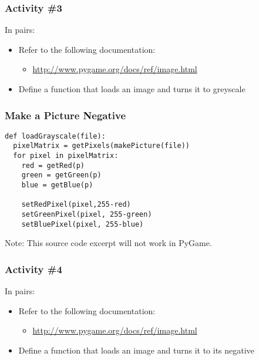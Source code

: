 \begin{frame}
	\frametitle{Activity \#3}
	
	In pairs:
	
	\vspace{2em}
	
	\begin{itemize}
		\item Refer to the following documentation:
		\begin{itemize}
			\item \url{http://www.pygame.org/docs/ref/image.html}
		\end{itemize}
		\item Define a function that loads an image and turns it to greyscale
	\end{itemize}
\end{frame}

\begin{frame}[fragile]
	\frametitle{Make a Picture Negative}
	
\begin{lstlisting}
def loadGrayscale(file):
  pixelMatrix = getPixels(makePicture(file))
  for pixel in pixelMatrix:
    red = getRed(p)
    green = getGreen(p)
    blue = getBlue(p)
        
    setRedPixel(pixel,255-red)
    setGreenPixel(pixel, 255-green)
    setBluePixel(pixel, 255-blue)
\end{lstlisting}

Note: This source code excerpt will not work in PyGame.

\end{frame}

\begin{frame}
	\frametitle{Activity \#4}
	
	In pairs:
	
	\vspace{2em}
	
	\begin{itemize}
		\item Refer to the following documentation:
		\begin{itemize}
			\item \url{http://www.pygame.org/docs/ref/image.html}
		\end{itemize}
		\item Define a function that loads an image and turns it to its negative
	\end{itemize}
\end{frame}

